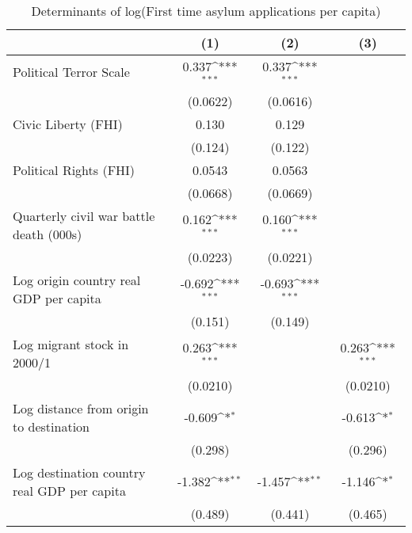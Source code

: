 \begin{table}[htbp]\centering
\def\sym#1{\ifmmode^{#1}\else\(^{#1}\)\fi}
\caption{Determinants of log(First time asylum applications per capita)}
\begin{tabular}{l*{3}{c}}
\hline\hline
                    &\multicolumn{1}{c}{(1)}         &\multicolumn{1}{c}{(2)}         &\multicolumn{1}{c}{(3)}         \\
\hline
Political Terror Scale&       0.337\sym{***}&       0.337\sym{***}&                     \\
                    &    (0.0622)         &    (0.0616)         &                     \\
[1em]
Civic Liberty (FHI) &       0.130         &       0.129         &                     \\
                    &     (0.124)         &     (0.122)         &                     \\
[1em]
Political Rights (FHI)&      0.0543         &      0.0563         &                     \\
                    &    (0.0668)         &    (0.0669)         &                     \\
[1em]
Quarterly civil war battle death (000s)&       0.162\sym{***}&       0.160\sym{***}&                     \\
                    &    (0.0223)         &    (0.0221)         &                     \\
[1em]
Log origin country real GDP per capita&      -0.692\sym{***}&      -0.693\sym{***}&                     \\
                    &     (0.151)         &     (0.149)         &                     \\
[1em]
Log migrant stock in 2000/1&       0.263\sym{***}&                     &       0.263\sym{***}\\
                    &    (0.0210)         &                     &    (0.0210)         \\
[1em]
Log distance from origin to destination&      -0.609\sym{*}  &                     &      -0.613\sym{*}  \\
                    &     (0.298)         &                     &     (0.296)         \\
[1em]
Log destination country real GDP per capita&      -1.382\sym{**} &      -1.457\sym{**} &      -1.146\sym{*}  \\
                    &     (0.489)         &     (0.441)         &     (0.465)         \\

\end{tabular}
\end{table}
